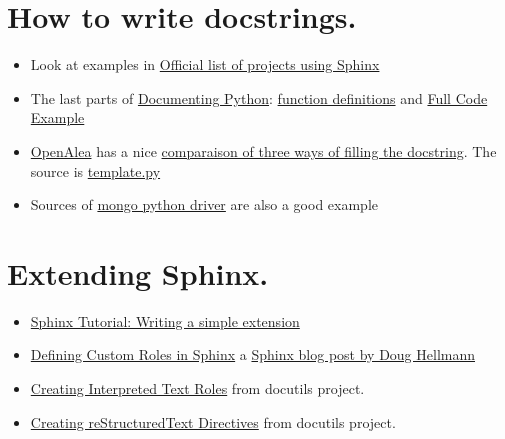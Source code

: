 \documentclass[a4paper,11pt,french]{rtdsphinxmanual}
\begin{document}
\section{How to write docstrings.}
\label{references:how-to-write-docstrings}\begin{itemize}
\item {} 
Look at examples in \href{http://sphinx.pocoo.org/examples.html}{Official list of projects using Sphinx}

\item {} 
The last parts of \href{http://docs.python.org/devguide/documenting.html}{Documenting Python}:
\href{http://packages.python.org/an\_example\_pypi\_project/sphinx.html\#function-definitions}{function definitions}
and \href{http://packages.python.org/an\_example\_pypi\_project/sphinx.html\#full-code-example}{Full Code Example}

\item {} 
\href{http://openalea.gforge.inria.fr/wiki/doku.php?id=documentation:doctests:how\_to\_document\_python\_api}{OpenAlea}
has a nice \href{http://openalea.gforge.inria.fr/wiki/doku.php?id=documentation:doctests:sphinx\_proposal\#filling\_the\_docstring}{comparaison of three ways of filling the docstring}.
The source is  \href{https://gforge.inria.fr/scm/viewvc.php/trunk/doc/source/sphinx/template.py?view=markup\&root=openalea}{template.py}

\item {} 
Sources of
\href{https://github.com/mongodb/mongo-python-driver}{mongo python driver}
are also a good example

\end{itemize}


\section{Extending Sphinx.}
\label{references:extending-sphinx}\begin{itemize}
\item {} 
\href{http://sphinx.pocoo.org/ext/tutorial.html}{Sphinx Tutorial: Writing a simple extension}

\item {} 
\href{http://www.doughellmann.com/articles/how-tos/sphinx-custom-roles/index.html}{Defining Custom Roles in Sphinx}
a  \href{http://blog.doughellmann.com/search/label/sphinx}{Sphinx blog post by Doug Hellmann}

\item {} 
\href{http://docutils.sourceforge.net/docs/ref/rst/rst-roles.html}{Creating Interpreted Text Roles}
from docutils project.

\item {} 
\href{http://docutils.sourceforge.net/docs/ref/rst/rst-directives.html}{Creating reStructuredText Directives}
from docutils project.

\end{itemize}
\end{document}

